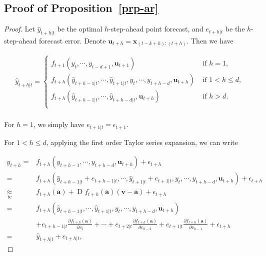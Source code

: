 \documentclass[
  11pt,
  a4paper,
]{article}
\theoremstyle{plain}
\theoremstyle{plain}
\theoremstyle{remark}
\begin{document}
\subsection{\texorpdfstring{Proof of
Proposition~\ref{prp-ar}}{Proof of Proposition~}}\label{sec-proof_ar}

\begin{proof}
Let \(\hat{y}_{t+h|t}\) be the optimal \(h\)-step-ahead point forecast,
and \(e_{t+h|t}\) be the \(h\)-step-ahead forecast error. Denote
\(\bm{u}_{t+h}=\bm{x}_{(t-k+h):(t+h)}\). Then we have

\[
\begin{aligned}
\hat{y}_{t+h|t}=\begin{cases}
      f_{t+1}\left(y_t,\cdots,y_{t-d+1},\bm{u}_{t+1}\right) & \text{ if } h=1, \\
      f_{t+h}\left(\hat{y}_{t+h-1|t},\cdots,\hat{y}_{t+1|t},y_t,\cdots,y_{t+h-d},\bm{u}_{t+h}\right) &  \text{ if } 1 < h \leq d, \\
      f_{t+h}\left(\hat{y}_{t+h-1|t},\cdots,\hat{y}_{t+h-d|t},\bm{u}_{t+h}\right) & \text{ if } h > d.\\
    \end{cases}\\
\end{aligned}
\]

For \(h=1\), we simply have \(e_{t+1|t} = \epsilon_{t+1}\).

For \(1<h\leq d\), applying the first order Taylor series expansion, we
can write

\[
\begin{aligned}
y_{t+h}
=&f_{t+h}\left(y_{t+h-1},\cdots,y_{t+h-d},\bm{u}_{t+h}\right)+\epsilon_{t+h} \\
=&f_{t+h}\left(\hat{y}_{t+h-1|t}+e_{t+h-1|t},\cdots,\hat{y}_{t+1|t}+e_{t+1|t},y_{t},\cdots,y_{t+h-d},\bm{u}_{t+h}\right)+\epsilon_{t+h} \\
\underset{\text{te}}{\approx}&f_{t+h}\left(\bm{a}\right)+\operatorname{D}f_{t+h}\left(\bm{a}\right)\left(\bm{v}-\bm{a}\right)+
\epsilon_{t+h} \\
=&f_{t+h}\left(\hat{y}_{t+h-1|t},\cdots,\hat{y}_{t+1|t},y_{t},\cdots,y_{t+h-d},\bm{u}_{t+h}\right) \\
&+e_{t+h-1|t}\frac{\partial f_{t+h}\left(\bm{a}\right)}{\partial v_1}+\cdots+e_{t+2|t}\frac{\partial f_{t+h}\left(\bm{a}\right)}{\partial v_{h-2}}+e_{t+1|t}\frac{\partial f_{t+h}\left(\bm{a}\right)}{\partial v_{h-1}}+\epsilon_{t+h} \\
=&\hat{y}_{t+h|t}+e_{t+h|t},
\end{aligned}
\]


\end{proof}
\end{document}
